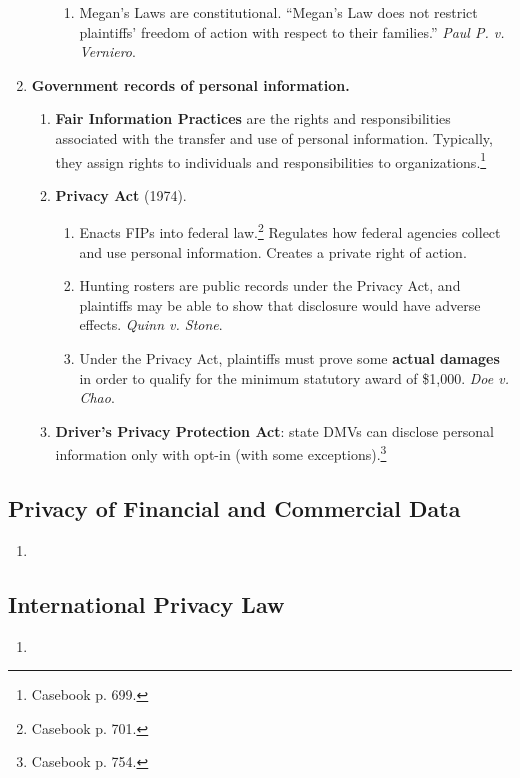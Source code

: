 \begin{enumerate}
\begin{enumerate}
\begin{enumerate}
            \item Megan's Laws are constitutional. ``Megan's Law does not 
            restrict plaintiffs' freedom of action with respect to their 
            families.'' \emph{Paul P. v. Verniero}.
        \end{enumerate}
    \end{enumerate}
    \item \textbf{Government records of personal information.}
    \begin{enumerate}
        \item \textbf{Fair Information Practices} are the rights and 
        responsibilities associated with the transfer and use of personal 
        information. Typically, they assign rights to individuals and 
        responsibilities to organizations.\footnote{Casebook p.  699.}
        \item \textbf{Privacy Act} (1974).
        \begin{enumerate}
            \item Enacts FIPs into federal law.\footnote{Casebook p. 701.} 
            Regulates how federal agencies collect and use personal 
            information. Creates a private right of action.
            \item Hunting rosters are public records under the Privacy Act, 
            and plaintiffs may be able to show that disclosure would have 
            adverse effects. \emph{Quinn v. Stone}.
            \item Under the Privacy Act, plaintiffs must prove some 
            \textbf{actual damages} in order to qualify for the minimum 
            statutory award of \$1,000. \emph{Doe v. Chao}.
        \end{enumerate}
        \item \textbf{Driver's Privacy Protection Act}: state DMVs can 
        disclose personal information only with opt-in (with some 
        exceptions).\footnote{Casebook p. 754.}
    \end{enumerate}
\end{enumerate}

\newpage

\subsection{Privacy of Financial and Commercial Data}

\begin{enumerate}
    \item %
\end{enumerate}

\newpage

\subsection{International Privacy Law}

\begin{enumerate}
    \item %
\end{enumerate}
